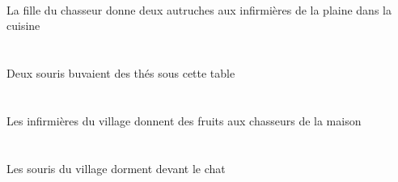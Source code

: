 \begin{exe}
    \DEFSgOblG{}   \cuisineDSgOblG{}   \DANSG{}   \DEFSgErgG{}    \DEFSgOblG{}   \chasseurCSgOblG{}   \DEG{}   \filleCSgErgG{}    \DEFPlOblG{}    \DEFSgOblG{}   \plaineASgOblG{}   \DEG{}   \infirmiereAPlOblG{}   \AG{}   \INDDuAbsG{}   \autrucheBDuAbsG{}  \donnerVdPrsBDuG{} \\
 La fille du chasseur donne deux autruches aux infirmières de la plaine dans la cuisine
\ex\glll
    \DEMSgObl{}   \tableDSgObl{}   \SOUS{}   \INDDuErg{}   \sourisBDuErg{}   \INDPlAbs{}   \theBPlAbs{}  \boireVtPstBPl{} \\
    \DEMSgOblP{}   \tableDSgOblP{}   \SOUSP{}   \INDDuErgP{}   \sourisBDuErgP{}   \INDPlAbsP{}   \theBPlAbsP{}  \boireVtPstBPlP{} \\
    \DEMSgOblG{}   \tableDSgOblG{}   \SOUSG{}   \INDDuErgG{}   \sourisBDuErgG{}   \INDPlAbsG{}   \theBPlAbsG{}  \boireVtPstBPlG{} \\
 Deux souris buvaient des thés sous cette table
\ex\glll
    \DEFSgObl{}   \maisonDSgObl{}   \DE{}   \DEFPlErg{}    \DEFSgObl{}   \villageCSgObl{}   \DE{}   \infirmiereAPlErg{}    \DEFPlObl{}   \chasseurCPlObl{}   \A{}   \INDPlAbs{}   \fruitAPlAbs{}  \donnerVdPrsAPl{} \\
    \DEFSgOblP{}   \maisonDSgOblP{}   \DEP{}   \DEFPlErgP{}    \DEFSgOblP{}   \villageCSgOblP{}   \DEP{}   \infirmiereAPlErgP{}    \DEFPlOblP{}   \chasseurCPlOblP{}   \AP{}   \INDPlAbsP{}   \fruitAPlAbsP{}  \donnerVdPrsAPlP{} \\
    \DEFSgOblG{}   \maisonDSgOblG{}   \DEG{}   \DEFPlErgG{}    \DEFSgOblG{}   \villageCSgOblG{}   \DEG{}   \infirmiereAPlErgG{}    \DEFPlOblG{}   \chasseurCPlOblG{}   \AG{}   \INDPlAbsG{}   \fruitAPlAbsG{}  \donnerVdPrsAPlG{} \\
 Les infirmières du village donnent des fruits aux chasseurs de la maison
\ex\glll
   \DEFPlAbs{}    \DEFSgObl{}   \villageCSgObl{}   \DE{}   \sourisBPlAbs{}    \DEFSgObl{}   \chatDSgObl{}   \DEVANT{}  \dormirViPrsBPl{} \\
   \DEFPlAbsP{}    \DEFSgOblP{}   \villageCSgOblP{}   \DEP{}   \sourisBPlAbsP{}    \DEFSgOblP{}   \chatDSgOblP{}   \DEVANTP{}  \dormirViPrsBPlP{} \\
   \DEFPlAbsG{}    \DEFSgOblG{}   \villageCSgOblG{}   \DEG{}   \sourisBPlAbsG{}    \DEFSgOblG{}   \chatDSgOblG{}   \DEVANTG{}  \dormirViPrsBPlG{} \\
 Les souris du village dorment devant le chat
\ex\glll
   \DEFPlAbs{}    \DEFPlObl{}   \grandCPl{}   \maigreCPl{}   \filleCPlObl{}   \DE{}   \petitDPl{}   \litDPlAbs{}    \DEFSgObl{}   \chambreBSgObl{}   \DANS{}  \arriverViPrsDPl{} \\

\end{exe}
